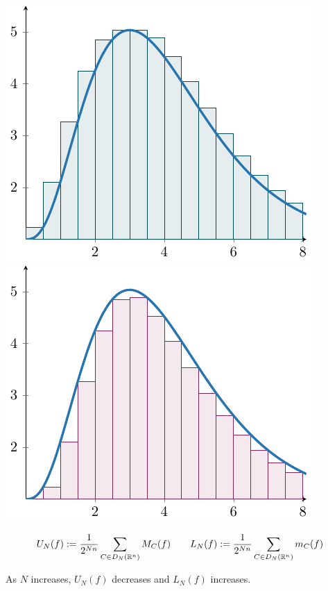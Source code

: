    \begin{center}
        \includegraphics{chapters/4-IntegrationRn/figures/figures-upperdarboux.pdf}
        \includegraphics{chapters/4-IntegrationRn/figures/figures-lowerdarboux.pdf}
    \end{center}

    \begin{proposition}
    $$U_N(f) := \frac{1}{2^{Nn}} \sum_{C \in D_N(\mathbb{R}^n)} M_C(f)  \qquad L_N(f) := \frac{1}{2^{Nn}}\sum_{C \in D_N(\mathbb{R}^n)} m_C(f)$$
    \end{proposition}
    
    \begin{proposition}
    As $N$ increases, $U_N(f)$ decreases and $L_N(f)$ increases.
    \end{proposition}

